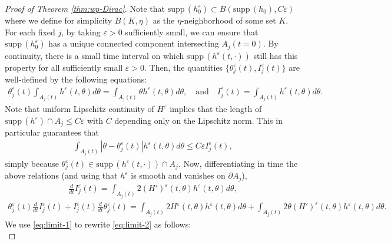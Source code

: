 \documentclass[10pt]{article}
\theoremstyle{definition}
\theoremstyle{remark}
\numberwithin{equation}{section}
\newcommand{\supp}{{\mathrm{supp}}\,}
\newcommand{\0}{\emptyset}
\newcommand{\tht}{\theta}
\newcommand{\varep}{\varepsilon}
\begin{document}
\begin{proof}[Proof of Theorem \ref{thm:wp-Dirac}]
		Note that $\supp(h_0^{\varep}) \subset B( \supp(h_0), C\varep )$ where we define for simplicity $B(K,\eta)$ as the $\eta$-neighborhood of some set $K$. For each fixed $j$, by taking $\varep>0$ sufficiently small, we can ensure that $\supp(h_0^{\varep})$ has a unique connected component intersecting $A_{j}(t=0)$. By continuity, there is a small time interval on which $\supp(h^\varep(t,\cdot))$ still has this property for all sufficiently small $\varep>0$. Then, the quantities $\{ \tht_{j}^\varep(t), I_{j}^{\varep}(t) \}$ are well-defined by the following equations:  \begin{equation*}
			\begin{split}
				\tht_{j}^{\varep}(t) \int_{A_{j}(t)} h^\varep(t,\tht) d\tht = \int_{A_{j}(t)} \tht h^\varep(t,\tht) d\tht , \quad \mbox{and} \quad I_{j}^{\varep}(t) =  \int_{A_{j}(t)} h^\varep(t,\tht) d\tht. 
			\end{split}
		\end{equation*} Note that uniform Lipschitz continuity of $H^\varep$ implies that the length of $\supp(h^\varep)\cap A_{j} \le C\varep$ with $C$ depending only on the Lipschitz norm. This in particular guarantees that \begin{equation*}
			\begin{split}
				\int_{A_j(t)} |\tht - \tht_{j}^{\varep}(t)| h^\varep(t,\tht) d\tht \le C\varep I_{j}^{\varep}(t),
			\end{split}
		\end{equation*} simply because $\tht_{j}^{\varep}(t) \in \supp(h^\varep(t,\cdot)) \cap A_{j}$. 
		Now, differentiating in time the above relations (and using that $h^\varep$ is smooth and vanishes on $\partial A_{j}$), \begin{equation}\label{eq:limit-1}
			\begin{split}
				\frac{d}{dt} I_{j}^{\varep}(t) = \int_{A_{j}(t)} 2 (H')^\varep(t,\tht) h^\varep(t,\tht) d\tht, 
			\end{split}
		\end{equation}
		\begin{equation}\label{eq:limit-2}
			\begin{split}
				\tht_{j}^{\varep}(t)\frac{d}{dt} I_{j}^{\varep}(t) +I_{j}^{\varep}(t)  \frac{d}{dt} \tht_{j}^{\varep}(t)= \int_{A_{j}(t)} 2 H^\varep(t,\tht) h^\varep(t,\tht) d\tht + \int_{A_{j}(t)} 2\tht (H')^\varep(t,\tht) h^\varep(t,\tht) d\tht .
			\end{split}
		\end{equation} We use \eqref{eq:limit-1} to rewrite \eqref{eq:limit-2} as follows: \begin{equation*}

\end{equation*}
\end{proof}
\end{document}
